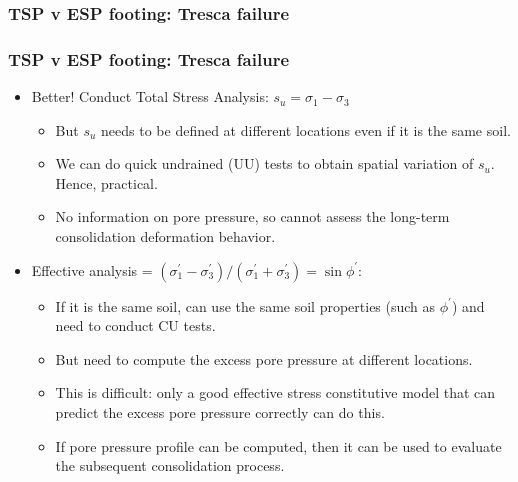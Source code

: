 \documentclass[notes]{beamer}
\begin{document}
\begin{frame}
\frametitle{TSP v ESP footing: Tresca failure}
\end{frame}

\begin{frame}
\frametitle{TSP v ESP footing: Tresca failure}
\begin{itemize}
	\item Better! Conduct Total Stress Analysis: $s_u = \sigma_1 - \sigma_3$
	\begin{itemize}
		\item But $s_u$ needs to be defined at different locations even if it is the same
		soil.
		\item We can do quick undrained (UU) tests to obtain spatial variation of
		$s_u$. Hence, practical.
		\item No information on pore pressure, so cannot assess the long-term consolidation deformation behavior.
	\end{itemize}
	\item Effective analysis = $(\sigma_1^\prime - \sigma_3^\prime)/(\sigma_1^\prime + \sigma_3^\prime) = \sin \phi^\prime$:
	\begin{itemize}
		\item If it is the same soil, can use the same soil properties (such as $\phi^\prime$)
		and need to conduct CU tests.
		\item But need to compute the excess pore pressure at different locations.
		\item This is difficult: only a good effective stress constitutive model that
		can predict the excess pore pressure correctly can do this.
		\item If pore pressure profile can be computed, then it can be used to
		evaluate the subsequent consolidation process.
	\end{itemize}
\end{itemize}
\end{frame}
\end{document}
